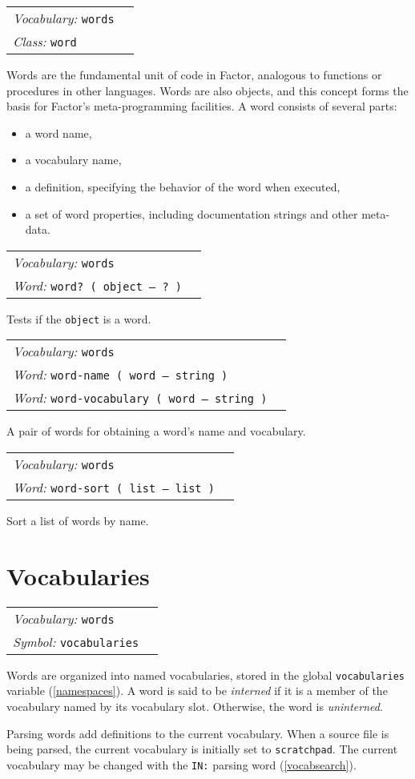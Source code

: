 \documentclass{book}
\newcommand{\vocabulary}[1]{\emph{Vocabulary:} \texttt{#1}&\\}
\newcommand{\ordinaryword}[2]{\index{\texttt{#1}}\emph{Word:} \texttt{#2}&\\}
\newcommand{\symbolword}[1]{\index{\texttt{#1}}\emph{Symbol:} \texttt{#1}&\\}
\newcommand{\classword}[1]{\index{\texttt{#1}}\emph{Class:} \texttt{#1}&\\}
\newcommand{\wordtable}[1]{


\begin{tabularx}{12cm}{lX}
\hline
#1
\hline
\end{tabularx}

}
\begin{document}
\wordglos
\vocabglos
\newcommand{\definingwordglos}{\glossary{name=defining word,
description=a word that adds definitions to the dictionary}}
\wordtable{
\vocabulary{words}
\classword{word}
}
Words are the fundamental unit of code in Factor, analogous to functions or procedures in other languages. Words are also objects, and this concept forms the basis for Factor's meta-programming facilities. A word consists of several parts:
\begin{itemize}
\item a word name,
\item a vocabulary name,
\item a definition, specifying the behavior of the word when executed,
\item a set of word properties, including documentation strings and other meta-data.
\end{itemize}
\wordtable{
\vocabulary{words}
\ordinaryword{word?}{word?~( object -- ?~)}
}
Tests if the \texttt{object} is a word.

\wordtable{
\vocabulary{words}
\ordinaryword{word-name}{word-name ( word -- string )}
\ordinaryword{word-vocabulary}{word-vocabulary ( word -- string )}
}
A pair of words for obtaining a word's name and vocabulary.

\wordtable{
\vocabulary{words}
\ordinaryword{word-sort}{word-sort ( list -- list )}

}
Sort a list of words by name.

\section{Vocabularies}\label{vocabularies}
\wordtable{
\vocabulary{words}
\symbolword{vocabularies}
}

Words are organized into named vocabularies, stored in the global \texttt{vocabularies} variable (\ref{namespaces}). A word is said to be \emph{interned} if it is a member of the vocabulary named by its vocabulary slot. Otherwise, the word is \emph{uninterned}.

Parsing words add definitions to the current vocabulary. When a source file is being parsed, the current vocabulary is initially set to \texttt{scratchpad}. The current vocabulary may be changed with the \verb|IN:| parsing word (\ref{vocabsearch}).
\end{document}
